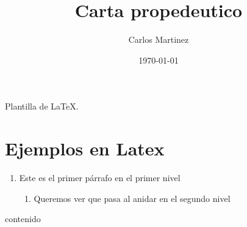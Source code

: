 \documentclass{article}
\author{Carlos Martinez}
\title{Carta propedeutico}
\date{\today}
\begin{document}
\maketitle

Plantilla de \LaTeX.

\section{Ejemplos en Latex}
\begin{enumerate}
\item Este es el primer párrafo en el primer nivel
  \begin{enumerate}
  \item Queremos ver que pasa al anidar en el segundo nivel
  \end{enumerate}
\end{enumerate}

contenido
\end{document}

